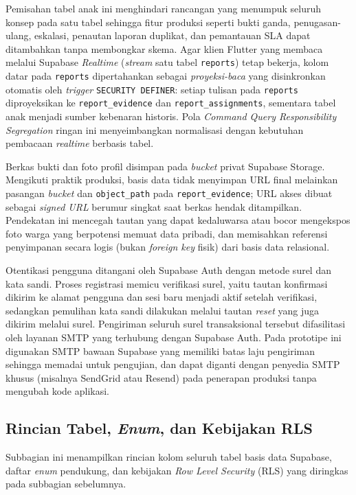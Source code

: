Pemisahan tabel anak ini menghindari rancangan yang menumpuk seluruh konsep pada satu tabel sehingga fitur produksi seperti bukti ganda, penugasan-ulang, eskalasi, penautan laporan duplikat, dan pemantauan SLA dapat ditambahkan tanpa membongkar skema. Agar klien Flutter yang membaca melalui Supabase \textit{Realtime} (\textit{stream} satu tabel \texttt{reports}) tetap bekerja, kolom datar pada \texttt{reports} dipertahankan sebagai \textit{proyeksi-baca} yang disinkronkan otomatis oleh \textit{trigger} \texttt{SECURITY DEFINER}: setiap tulisan pada \texttt{reports} diproyeksikan ke \texttt{report\_evidence} dan \texttt{report\_assignments}, sementara tabel anak menjadi sumber kebenaran historis. Pola \textit{Command Query Responsibility Segregation} ringan ini menyeimbangkan normalisasi dengan kebutuhan pembacaan \textit{realtime} berbasis tabel.

Berkas bukti dan foto profil disimpan pada \textit{bucket} privat Supabase Storage. Mengikuti praktik produksi, basis data tidak menyimpan URL final melainkan pasangan \textit{bucket} dan \texttt{object\_path} pada \texttt{report\_evidence}; URL akses dibuat sebagai \textit{signed URL} berumur singkat saat berkas hendak ditampilkan. Pendekatan ini mencegah tautan yang dapat kedaluwarsa atau bocor mengekspos foto warga yang berpotensi memuat data pribadi, dan memisahkan referensi penyimpanan secara logis (bukan \textit{foreign key} fisik) dari basis data relasional.

Otentikasi pengguna ditangani oleh Supabase Auth dengan metode surel dan kata sandi. Proses registrasi memicu verifikasi surel, yaitu tautan konfirmasi dikirim ke alamat pengguna dan sesi baru menjadi aktif setelah verifikasi, sedangkan pemulihan kata sandi dilakukan melalui tautan \textit{reset} yang juga dikirim melalui surel. Pengiriman seluruh surel transaksional tersebut difasilitasi oleh layanan SMTP yang terhubung dengan Supabase Auth. Pada prototipe ini digunakan SMTP bawaan Supabase yang memiliki batas laju pengiriman sehingga memadai untuk pengujian, dan dapat diganti dengan penyedia SMTP khusus (misalnya SendGrid atau Resend) pada penerapan produksi tanpa mengubah kode aplikasi.

\subsection{Rincian Tabel, \textit{Enum}, dan Kebijakan RLS}
\label{sec:db-schema-detail}

Subbagian ini menampilkan rincian kolom seluruh tabel basis data Supabase, daftar \textit{enum} pendukung, dan kebijakan \textit{Row Level Security} (RLS) yang diringkas pada subbagian sebelumnya.


